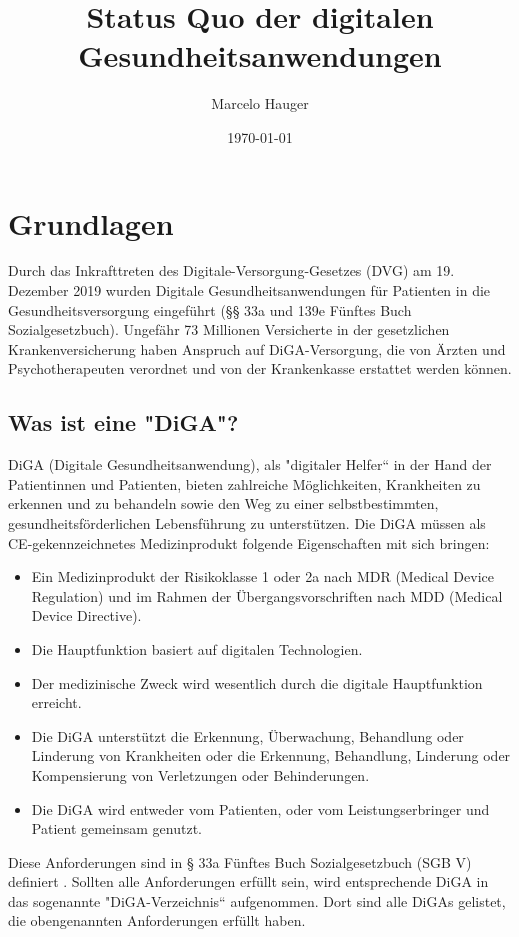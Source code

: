 \documentclass{article}
\title{Status Quo der digitalen Gesundheitsanwendungen}
\author{Marcelo Hauger}
\date{\today}
\begin{document}
	\maketitle
	\newpage
	\tableofcontents
	\newpage
	\listoffigures
	\newpage
	\section{Grundlagen}
		Durch das Inkrafttreten des Digitale-Versorgung-Gesetzes (DVG) am 19. Dezember 2019 wurden Digitale Gesundheitsanwendungen für Patienten in die Gesundheitsversorgung eingeführt (§§ 33a und 139e Fünftes Buch Sozialgesetzbuch). Ungefähr 73 Millionen Versicherte in der gesetzlichen Krankenversicherung haben Anspruch auf DiGA-Versorgung, die von Ärzten und Psychotherapeuten verordnet und von der Krankenkasse erstattet werden können.
		\subsection{Was ist eine "DiGA"?}
			DiGA (Digitale Gesundheitsanwendung), als "digitaler Helfer`` in der Hand der Patientinnen und Patienten, bieten zahlreiche Möglichkeiten, Krankheiten zu erkennen und zu behandeln sowie den Weg zu einer selbstbestimmten, gesundheitsförderlichen Lebensführung zu unterstützen. Die DiGA müssen als CE-gekennzeichnetes Medizinprodukt folgende Eigenschaften mit sich bringen:
			\begin{itemize}
				\item Ein Medizinprodukt der Risikoklasse 1 oder 2a nach MDR (Medical Device Regulation) und im Rahmen der Übergangsvorschriften nach MDD (Medical Device Directive).
				\item Die Hauptfunktion basiert auf digitalen Technologien.
				\item Der medizinische Zweck wird wesentlich durch die digitale Hauptfunktion erreicht.
				\item Die DiGA unterstützt die Erkennung, Überwachung, Behandlung oder Linderung von Krankheiten oder die Erkennung, Behandlung, Linderung oder Kompensierung von Verletzungen oder Behinderungen.
				\item Die DiGA wird entweder vom Patienten, oder vom Leistungserbringer und Patient gemeinsam genutzt.
			\end{itemize}  
			Diese Anforderungen sind in § 33a Fünftes Buch Sozialgesetzbuch (SGB V) definiert \cite[vgl. Was ist eine DiGA?]{wissenswertes-diga}. Sollten alle Anforderungen erfüllt sein, wird entsprechende DiGA in das sogenannte "DiGA-Verzeichnis`` aufgenommen. Dort sind alle DiGAs gelistet, die obengenannten Anforderungen erfüllt haben.   
		\newpage
\end{document}
